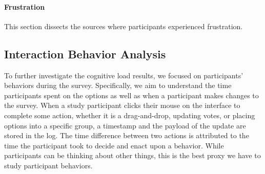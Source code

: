 \paragraph{Frustration} This section dissects the sources where participants experienced frustration.

\subsection{Interaction Behavior Analysis}
To further investigate the cognitive load results, we focused on participants' behaviors during the survey. Specifically, we aim to understand the time participants spent on the options as well as when a participant makes changes to the survey. When a study participant clicks their mouse on the interface to complete some action, whether it is a drag-and-drop, updating votes, or placing options into a specific group, a timestamp and the payload of the update are stored in the log. The time difference between two actions is attributed to the time the participant took to decide and enact upon a behavior. While participants can be thinking about other things, this is the best proxy we have to study participant behaviors.

